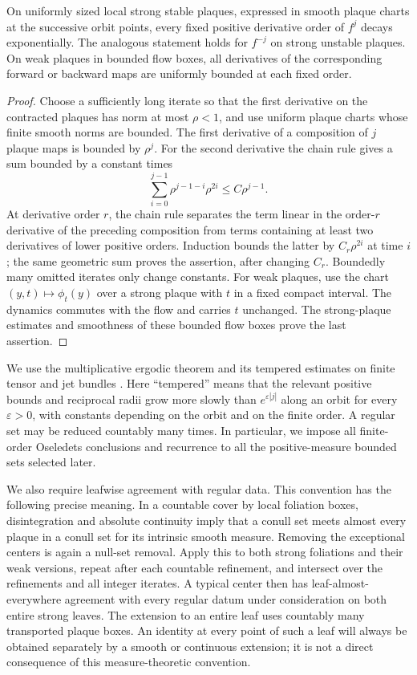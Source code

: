 \begin{lemma}\label{pre:plaque-contraction}
On uniformly sized local strong stable plaques, expressed in smooth
plaque charts at the successive orbit points, every fixed positive
derivative order of $f^j$ decays exponentially. The analogous statement
holds for $f^{-j}$ on strong unstable plaques. On weak plaques in
bounded flow boxes, all derivatives of the corresponding forward or
backward maps are uniformly bounded at each fixed order.
\end{lemma}

\begin{proof}
Choose a sufficiently long iterate so that the first derivative on
the contracted plaques has norm at most $\rho<1$, and use uniform
plaque charts whose finite smooth norms are bounded. The first
derivative of a composition of $j$ plaque maps is bounded by
$\rho^j$. For the second derivative the chain rule gives a sum
bounded by a constant times
\[
 \sum_{i=0}^{j-1}\rho^{j-1-i}\rho^{2i}
 \le C\rho^{j-1}.
\]
At derivative order $r$, the chain rule separates the term linear
in the order-$r$ derivative of the preceding composition from terms
containing at least two derivatives of lower positive orders.
Induction bounds the latter by $C_r\rho^{2i}$ at time $i$; the same
geometric sum proves the assertion, after changing $C_r$.
Boundedly many omitted iterates only change constants.
For weak plaques, use the chart $(y,t)\mapsto\phi_t(y)$ over a
strong plaque with $t$ in a fixed compact interval. The dynamics
commutes with the flow and carries $t$ unchanged. The strong-plaque
estimates and smoothness of these bounded flow boxes prove the last
assertion.
\end{proof}

We use the multiplicative ergodic theorem and its tempered estimates
on finite tensor and jet bundles \citep{Oseledets1968}. Here
``tempered'' means that the relevant positive bounds and reciprocal
radii grow more slowly than $e^{\varepsilon |j|}$ along an orbit for
every $\varepsilon>0$, with constants depending on the orbit and on
the finite order. A regular set may be reduced countably many times.
In particular, we impose all finite-order Oseledets conclusions and
recurrence to all the positive-measure bounded sets selected later.

We also require leafwise agreement with regular data. This convention
has the following precise meaning. In a countable cover by local
foliation boxes, disintegration and absolute continuity imply that
a conull set meets almost every plaque in a conull set for its
intrinsic smooth measure. Removing the exceptional centers is again
a null-set removal. Apply this to both strong foliations and their
weak versions, repeat after each countable refinement, and intersect
over the refinements and all integer iterates. A typical center then
has leaf-almost-everywhere agreement with every regular datum under
consideration on both entire strong leaves. The extension to an
entire leaf uses countably many transported plaque boxes. An
identity at every point of such a leaf will always be obtained
separately by a smooth or continuous extension; it is not a direct
consequence of this measure-theoretic convention.

